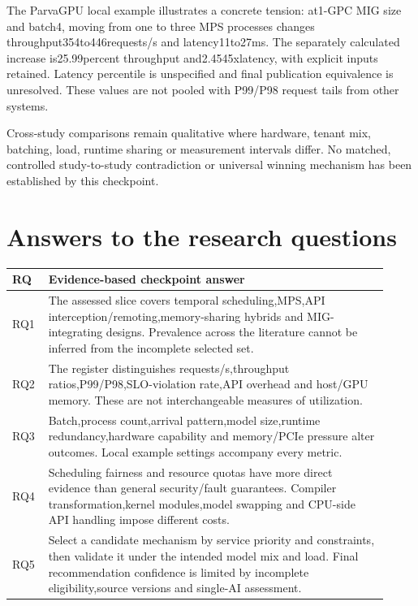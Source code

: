 The ParvaGPU local example illustrates a concrete tension:\allowbreak{} at1-GPC MIG size and batch4, moving from one to three MPS processes changes throughput354to446requests/\allowbreak{}s and latency11to27ms. The separately calculated increase is25.99percent throughput and2.4545xlatency, with explicit inputs retained. Latency percentile is unspecified and final publication equivalence is unresolved. These values are not pooled with P99/\allowbreak{}P98 request tails from other systems.


Cross-study comparisons remain qualitative where hardware, tenant mix, batching, load, runtime sharing or measurement intervals differ. No matched, controlled study-to-study contradiction or universal winning mechanism has been established by this checkpoint.



\section{Answers to the research questions}


{\small\begin{longtable}{>{\raggedright\arraybackslash}p{0.08\linewidth}>{\raggedright\arraybackslash}p{0.84\linewidth}}
\toprule
RQ & Evidence-based checkpoint answer\\\midrule
\endhead
RQ1 & The assessed slice covers temporal scheduling,MPS,API interception/\allowbreak{}remoting,memory-sharing hybrids and MIG-integrating designs. Prevalence across the literature cannot be inferred from the incomplete selected set.\\
RQ2 & The register distinguishes requests/\allowbreak{}s,throughput ratios,P99/\allowbreak{}P98,SLO-violation rate,API overhead and host/\allowbreak{}GPU memory. These are not interchangeable measures of utilization.\\
RQ3 & Batch,process count,arrival pattern,model size,runtime redundancy,hardware capability and memory/\allowbreak{}PCIe pressure alter outcomes. Local example settings accompany every metric.\\
RQ4 & Scheduling fairness and resource quotas have more direct evidence than general security/\allowbreak{}fault guarantees. Compiler transformation,kernel modules,model swapping and CPU-side API handling impose different costs.\\
RQ5 & Select a candidate mechanism by service priority and constraints, then validate it under the intended model mix and load. Final recommendation confidence is limited by incomplete eligibility,source versions and single-AI assessment.\\
\bottomrule
\end{longtable}}



